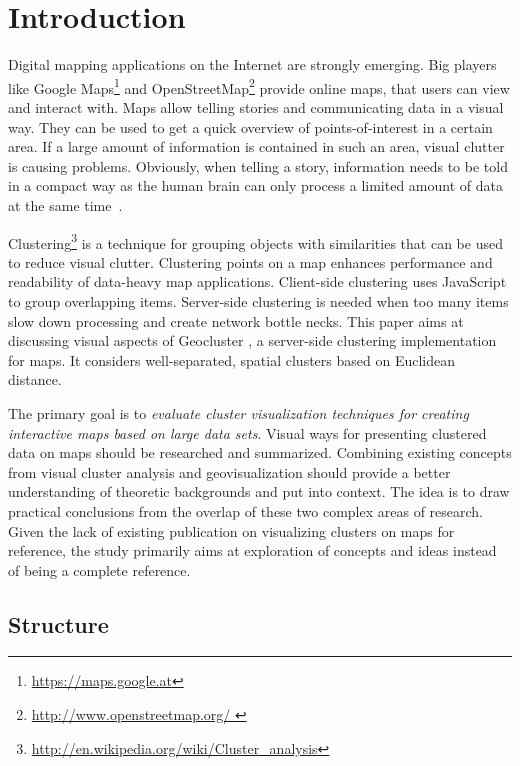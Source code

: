 
%
%

\chapter{Introduction}

Digital mapping applications on the Internet are strongly emerging. Big players like Google Maps\footnote{\url{https://maps.google.at}} and OpenStreetMap\footnote{\url{http://www.openstreetmap.org/ }} provide online maps, that users can view and interact with. Maps allow telling stories and communicating data in a visual way. They can be used to get a quick overview of points-of-interest in a certain area. If a large amount of information is contained in such an area, visual clutter is causing problems. Obviously, when telling a story, information needs to be told in a compact way as the human brain can only process a limited amount of data at the same time~\cite{noellenburg11geovis, Delort10vis}.

Clustering\footnote{\url{http://en.wikipedia.org/wiki/Cluster_analysis}} is a technique for grouping objects with similarities that can be used to reduce visual clutter. Clustering points on a map enhances performance and readability of data-heavy map applications. Client-side clustering uses JavaScript to group overlapping items. Server-side clustering is needed when too many items slow down processing and create network bottle necks. This paper aims at discussing visual aspects of Geocluster \cite{geocluster-thesis}, a server-side clustering implementation for maps. It considers well-separated, spatial clusters based on Euclidean distance.

The primary goal is to \textit{evaluate cluster visualization techniques for creating interactive maps based on large data sets}. Visual ways for presenting clustered data on maps should be researched and summarized. Combining existing concepts from visual cluster analysis and geovisualization should provide a better understanding of theoretic backgrounds and put into context. The idea is to draw practical conclusions from the overlap of these two complex areas of research. Given the lack of existing publication on visualizing clusters on maps for reference, the study primarily aims at exploration of concepts and ideas instead of being a complete reference. 


\section{Structure}

